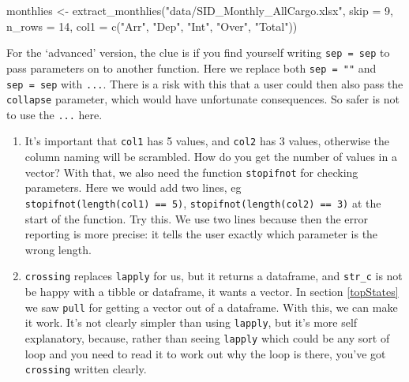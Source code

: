 \documentclass[
]{book}
\newenvironment{Shaded}{\begin{snugshade}}{\end{snugshade}}
\newcommand{\AttributeTok}[1]{\textcolor[rgb]{0.77,0.63,0.00}{#1}}
\newcommand{\DecValTok}[1]{\textcolor[rgb]{0.00,0.00,0.81}{#1}}
\newcommand{\FunctionTok}[1]{\textcolor[rgb]{0.00,0.00,0.00}{#1}}
\newcommand{\NormalTok}[1]{#1}
\newcommand{\OtherTok}[1]{\textcolor[rgb]{0.56,0.35,0.01}{#1}}
\newcommand{\StringTok}[1]{\textcolor[rgb]{0.31,0.60,0.02}{#1}}
\providecommand{\tightlist}{%
  \setlength{\itemsep}{0pt}\setlength{\parskip}{0pt}}
\begin{document}
\begin{Shaded}
\begin{Highlighting}[]
\NormalTok{monthlies }\OtherTok{\textless{}{-}} \FunctionTok{extract\_monthlies}\NormalTok{(}\StringTok{"data/SID\_Monthly\_AllCargo.xlsx"}\NormalTok{, }\AttributeTok{skip =} \DecValTok{9}\NormalTok{, }\AttributeTok{n\_rows =} \DecValTok{14}\NormalTok{,}
                               \AttributeTok{col1 =} \FunctionTok{c}\NormalTok{(}\StringTok{"Arr"}\NormalTok{, }\StringTok{"Dep"}\NormalTok{, }\StringTok{"Int"}\NormalTok{, }\StringTok{"Over"}\NormalTok{, }\StringTok{"Total"}\NormalTok{))}
\end{Highlighting}
\end{Shaded}

For the `advanced' version, the clue is if you find yourself writing \texttt{sep\ =\ sep} to pass parameters on to another function. Here we replace both \texttt{sep\ =\ ""} and \texttt{sep\ =\ sep} with \texttt{...}. There is a risk with this that a user could then also pass the \texttt{collapse} parameter, which would have unfortunate consequences. So safer is not to use the \texttt{...} here.

\begin{enumerate}
\def\labelenumi{\arabic{enumi})}
\setcounter{enumi}{11}
\tightlist
\item
  It's important that \texttt{col1} has 5 values, and \texttt{col2} has 3 values, otherwise the column naming will be scrambled. How do you get the number of values in a vector? With that, we also need the function \texttt{stopifnot} for checking parameters. Here we would add two lines, eg \texttt{stopifnot(length(col1)\ ==\ 5)}, \texttt{stopifnot(length(col2)\ ==\ 3)} at the start of the function. Try this. We use two lines because then the error reporting is more precise: it tells the user exactly which parameter is the wrong length.
\item
  \texttt{crossing} replaces \texttt{lapply} for us, but it returns a dataframe, and \texttt{str\_c} is not be happy with a tibble or dataframe, it wants a vector. In section \ref{topStates} we saw \texttt{pull} for getting a vector out of a dataframe. With this, we can make it work. It's not clearly simpler than using \texttt{lapply}, but it's more self explanatory, because, rather than seeing \texttt{lapply} which could be any sort of loop and you need to read it to work out why the loop is there, you've got \texttt{crossing} written clearly.
\end{enumerate}
\end{document}
